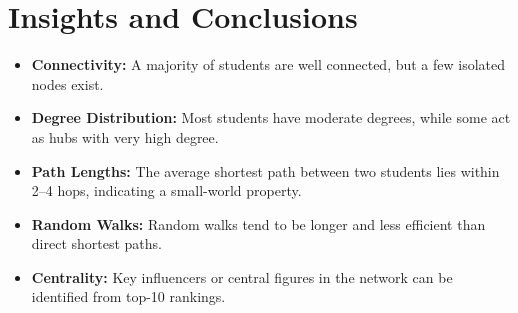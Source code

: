 \documentclass[10pt]{article}
\begin{document}
\vspace{1em}
\section*{Insights and Conclusions}

\begin{itemize}
    \item \textbf{Connectivity:} A majority of students are well connected, but a few isolated nodes exist.
    \item \textbf{Degree Distribution:} Most students have moderate degrees, while some act as hubs with very high degree.
    \item \textbf{Path Lengths:} The average shortest path between two students lies within 2–4 hops, indicating a small-world property.
    \item \textbf{Random Walks:} Random walks tend to be longer and less efficient than direct shortest paths.
    \item \textbf{Centrality:} Key influencers or central figures in the network can be identified from top-10 rankings.
\end{itemize}
\end{document}
